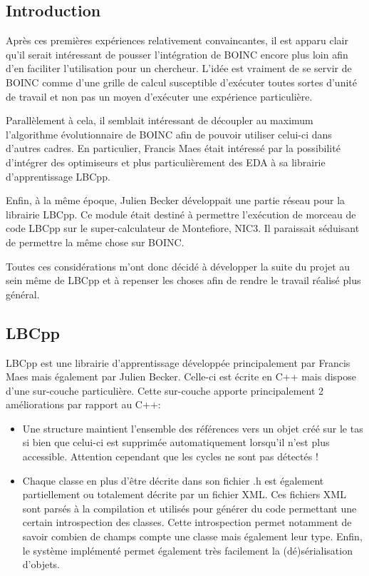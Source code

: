 \documentclass[a4paper, 11pt]{report}
\begin{document}
\subsection{Introduction}
Après ces premières expériences relativement convaincantes, il est apparu clair qu'il serait intéressant de pousser l'intégration de \textsc{BOINC} encore plus loin afin d'en faciliter l'utilisation pour un chercheur. L'idée est vraiment de se servir de \textsc{BOINC} comme d'une grille de calcul susceptible d'exécuter toutes sortes d'unité de travail et non pas un moyen d'exécuter une expérience particulière.

Parallèlement à cela, il semblait intéressant de découpler au maximum l'algorithme évolutionnaire de \textsc{BOINC} afin de pouvoir utiliser celui-ci dans d'autres cadres. En particulier, Francis Maes était intéressé par la possibilité d'intégrer des optimiseurs et plus particulièrement des EDA à sa librairie d'apprentissage LBCpp.

Enfin, à la même époque, Julien Becker développait une partie réseau pour la librairie LBCpp. Ce module était destiné à permettre l'exécution de morceau de code LBCpp sur le super-calculateur de Montefiore, NIC3. Il paraissait séduisant de permettre la même chose sur \textsc{BOINC}.

Toutes ces considérations m'ont donc décidé à développer la suite du projet au sein même de LBCpp et à repenser les choses afin de rendre le travail réalisé plus général.

\subsection{LBCpp}
LBCpp est une librairie d'apprentissage développée principalement par Francis Maes mais également par Julien Becker. Celle-ci est écrite en C++ mais dispose d'une sur-couche particulière. Cette sur-couche apporte principalement 2 améliorations par rapport au C++:
\begin{itemize}
\item Une structure maintient l'ensemble des références vers un objet créé sur le tas si bien que celui-ci est supprimée automatiquement lorsqu'il n'est plus accessible. Attention cependant que les cycles ne sont pas détectés !
\item Chaque classe en plus d'être décrite dans son fichier .h est également partiellement ou totalement décrite par un fichier XML. Ces fichiers XML sont parsés à la compilation et utilisés pour générer du code permettant une certain introspection des classes. Cette introspection permet notamment de savoir combien de champs compte une classe mais également leur type. Enfin, le système implémenté permet également très facilement la (dé)sérialisation d'objets.
\end{itemize}
\end{document}
